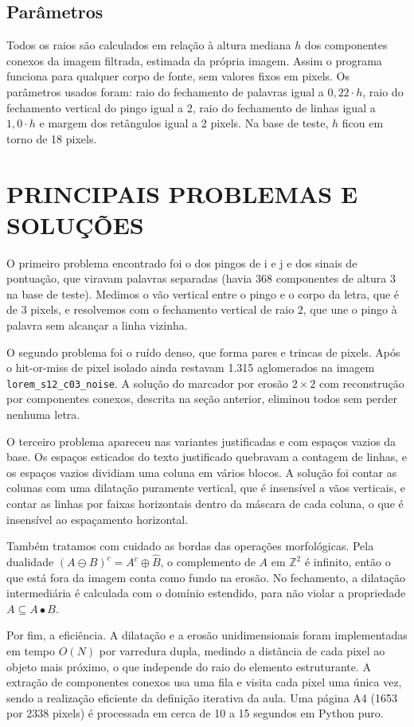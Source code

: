 \documentclass[12pt, a4paper]{article}
\begin{document}
\subsection{Parâmetros}
Todos os raios são calculados em relação à altura mediana $h$ dos componentes conexos da imagem filtrada, estimada da própria imagem. Assim o programa funciona para qualquer corpo de fonte, sem valores fixos em pixels. Os parâmetros usados foram: raio do fechamento de palavras igual a $0{,}22 \cdot h$, raio do fechamento vertical do pingo igual a 2, raio do fechamento de linhas igual a $1{,}0 \cdot h$ e margem dos retângulos igual a 2 pixels. Na base de teste, $h$ ficou em torno de 18 pixels.

\section{PRINCIPAIS PROBLEMAS E SOLUÇÕES}
O primeiro problema encontrado foi o dos pingos de i e j e dos sinais de pontuação, que viravam palavras separadas (havia 368 componentes de altura 3 na base de teste). Medimos o vão vertical entre o pingo e o corpo da letra, que é de 3 pixels, e resolvemos com o fechamento vertical de raio 2, que une o pingo à palavra sem alcançar a linha vizinha.

O segundo problema foi o ruído denso, que forma pares e trincas de pixels. Após o hit-or-miss de pixel isolado ainda restavam 1.315 aglomerados na imagem \texttt{lorem\_s12\_c03\_noise}. A solução do marcador por erosão $2 \times 2$ com reconstrução por componentes conexos, descrita na seção anterior, eliminou todos sem perder nenhuma letra.

O terceiro problema apareceu nas variantes justificadas e com espaços vazios da base. Os espaços esticados do texto justificado quebravam a contagem de linhas, e os espaços vazios dividiam uma coluna em vários blocos. A solução foi contar as colunas com uma dilatação puramente vertical, que é insensível a vãos verticais, e contar as linhas por faixas horizontais dentro da máscara de cada coluna, o que é insensível ao espaçamento horizontal.

Também tratamos com cuidado as bordas das operações morfológicas. Pela dualidade $(A \ominus B)^c = A^c \oplus \hat{B}$, o complemento de $A$ em $\mathbb{Z}^2$ é infinito, então o que está fora da imagem conta como fundo na erosão. No fechamento, a dilatação intermediária é calculada com o domínio estendido, para não violar a propriedade $A \subseteq A \bullet B$.

Por fim, a eficiência. A dilatação e a erosão unidimensionais foram implementadas em tempo $O(N)$ por varredura dupla, medindo a distância de cada pixel ao objeto mais próximo, o que independe do raio do elemento estruturante. A extração de componentes conexos usa uma fila e visita cada pixel uma única vez, sendo a realização eficiente da definição iterativa da aula. Uma página A4 (1653 por 2338 pixels) é processada em cerca de 10 a 15 segundos em Python puro.
\end{document}
